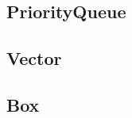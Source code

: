 % 

% 

% 

% 


% 

% 

% 

\label{sec:pq}


\subsection{PriorityQueue}

\clearpage

\clearpage
\subsection{Vector}

\clearpage
\subsection{Box}

\clearpage